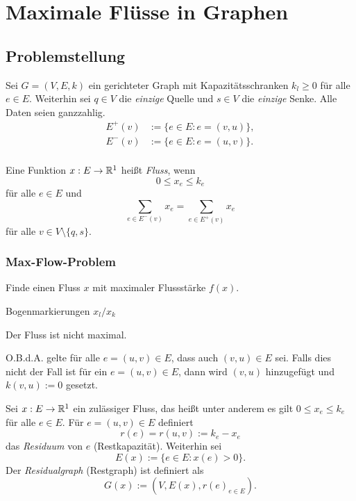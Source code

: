 \section{Maximale Flüsse in Graphen}
\subsection{Problemstellung}
Sei $G = (V,E,k)$ ein gerichteter Graph mit Kapazitätsschranken $k_l \ge 0$ für
alle $e \in E$. Weiterhin sei $q \in V$ die \emph{einzige} Quelle und $s \in V$
die \emph{einzige} Senke. Alle Daten seien ganzzahlig.
\begin{align*}
  E^+(v) &:= \{ e \in E: e = (v,u) \}, \\
  E^-(v) &:= \{ e \in E: e = (u,v) \}. \\
\end{align*}

\begin{defn} %
  Eine Funktion $x:E \to \mathbb{R}^1$ heißt \emph{Fluss}, wenn
  \[ 0 \le x_e \le k_e \]
  für alle $e \in E$ und
  \[ \sum_{e\in E^-(v)} x_e = \sum_{e \in E^+(v)} x_e \]
  für alle $v \in V \setminus \{ q, s \}$.
\end{defn}




\subsubsection*{Max-Flow-Problem}
Finde einen Fluss $x$ mit maximaler Flussstärke $f(x)$.

\begin{exmp} %
  Bogenmarkierungen $x_l / x_k$


  Der Fluss ist nicht maximal.

  O.B.d.A. gelte für alle $e = (u,v) \in E$, dass auch $(v,u) \in E$ sei. Falls
  dies nicht der Fall ist für ein $e = (u,v) \in E$, dann wird $(v,u)$
  hinzugefügt  und $k(v,u) := 0$ gesetzt.
\end{exmp}

\begin{defn} %
  Sei $x : E \to \mathbb{R}^1$ ein zulässiger Fluss, das heißt unter anderem es gilt
  $0 \le x_e \le k_e$ für alle $e \in E$. Für $e = (u,v) \in E$ definiert
  \[ r(e) = r(u,v) := k_e - x_e \]
  das \emph{Residuum} von $e$ (Restkapazität). Weiterhin sei
  \[ E(x) := \{ e \in E : x(e) > 0 \}. \]
  Der \emph{Residualgraph} (Restgraph) ist definiert als
  \[ G(x) := (V, E(x), r(e)_{e \in E}). \]
\end{defn}

